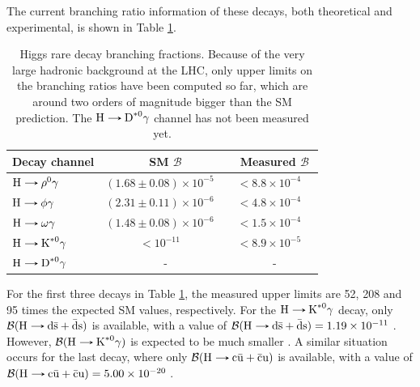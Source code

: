The current branching ratio information of these decays, both theoretical and experimental, is shown in Table \ref{tab:Higgs_rare_decays_values}.
\begin{table}[!ht]
    \centering
    \begin{tabular}{|l|cc|cc|}
        \hline
        \multicolumn{1}{|c|}{\cellcolor{lightgray}Decay channel} & \multicolumn{2}{c|}{\cellcolor{lightgray} SM $\mathcal{B}$} & \multicolumn{2}{c|}{\cellcolor{lightgray} Measured $\mathcal{B}$} \\ \hline
        $\text{H}\decaysto \rho^0\gamma$    & $(1.68 \pm 0.08)\times 10^{-5}$    & \cite{Konig:2015qat} & $< 8.8 \times 10^{-4}$ & \cite{ATLAS:2017gko}  \\
        $\text{H}\decaysto \phi\gamma$      & $(2.31 \pm 0.11)\times 10^{-6}$    & \cite{Konig:2015qat} & $< 4.8 \times 10^{-4}$ & \cite{ATLAS:2017gko}  \\
        $\text{H}\decaysto \omega\gamma$    & $(1.48 \pm 0.08)\times 10^{-6}$    & \cite{Konig:2015qat} & $< 1.5 \times 10^{-4}$ & \cite{ATLAS:2023alf}  \\
        $\text{H}\decaysto \text{K}^{*0}\gamma$    & $< 10^{-11}$                       & \cite{ATLAS:2023alf} & $< 8.9 \times 10^{-5}$ & \cite{ATLAS:2023alf}  \\
        $\text{H}\decaysto \text{D}^{*0}\gamma$    & \multicolumn{2}{c|}{-}             & \multicolumn{2}{c|}{-}  \\ \hline
    \end{tabular}
    \caption{Higgs rare decay branching fractions. Because of the very large hadronic background at the LHC, only upper limits on the branching ratios have been computed so far, which are around two orders of magnitude bigger than the SM prediction. The $\text{H}\protect\decaysto \text{D}^{*0}\gamma$ channel has not been measured yet.}
    \label{tab:Higgs_rare_decays_values}
\end{table}
For the first three decays in Table \ref{tab:Higgs_rare_decays_values}, the measured upper limits are 52, 208 and 95 times the expected SM values, respectively. For the $\text{H}\decaysto \text{K}^{*0}\gamma$ decay, only $\mathcal{B}(\text{H}\decaysto \text{d}\bar{\text{s}} + \bar{\text{d}}\text{s})$ is available, with a value of $\mathcal{B}(\text{H}\decaysto \text{d}\bar{\text{s}} + \bar{\text{d}}\text{s}) = 1.19\times 10^{-11}$ \cite{Aranda:2020tqw}. However, $\mathcal{B}(\text{H}\decaysto \text{K}^{*0}\gamma)$ is expected to be much smaller \cite{ATLAS:2023alf}. A similar situation occurs for the last decay, where only $\mathcal{B}(\text{H}\decaysto \text{c}\bar{\text{u}} + \bar{\text{c}}\text{u})$ is available, with a value of $\mathcal{B}(\text{H}\decaysto \text{c}\bar{\text{u}} + \bar{\text{c}}\text{u}) = 5.00\times 10^{-20}$ \cite{Aranda:2020tqw}.

